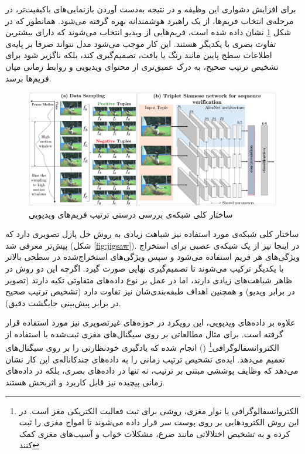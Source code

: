 برای افزایش دشواری این وظیفه و در نتیجه به‌دست آوردن بازنمایی‌های باکیفیت‌تر، در مرحله‌ی انتخاب فریم‌ها، از یک راهبرد هوشمندانه بهره گرفته می‌شود. همانطور که در شکل \ref{fig:video-permutation} نشان داده شده است، فریم‌هایی از ویدیو انتخاب می‌شوند که دارای بیشترین تفاوت‌ بصری با یکدیگر هستند. این کار موجب می‌شود مدل نتواند صرفا بر پایه‌ی اطلاعات سطح پایین مانند رنگ یا بافت، تصمیم‌گیری کند، بلکه ناگزیر شود برای تشخیص ترتیب صحیح، به درک عمیق‌تری از محتوای ویدیویی و روابط زمانی میان فریم‌ها برسد.

\begin{figure}[htbp]
\centering
\includegraphics[width=1\textwidth]{Images/Chapter2/video-permutation.png}
\caption{ساختار کلی شبکه‌ی بررسی درستی ترتیب فریم‌های ویدیویی}
\label{fig:video-permutation}
\end{figure}

ساختار کلی شبکه‌ی مورد استفاده نیز شباهت زیادی به روش حل پازل تصویری دارد که پیش‌تر معرفی شد (شکل \ref{fig:jigsaw}). در اینجا نیز از یک شبکه‌ی عصبی برای استخراج ویژگی‌های هر فریم استفاده می‌شود و سپس ویژگی‌های استخراج‌شده در سطحی بالاتر با یکدیگر ترکیب می‌شوند تا تصمیم‌گیری نهایی صورت گیرد. اگرچه این دو روش در ظاهر شباهت‌های زیادی دارند، اما در عمل بر نوع داده‌های متفاوتی تکیه دارند (تصویر در برابر ویدیو) و همچنین اهداف طبقه‌بندی‌شان نیز تفاوت دارد (تشخیص ترتیب صحیح در برابر پیش‌بینی جایگشت دقیق).

علاوه بر داده‌های ویدیویی، این رویکرد در حوزه‌های غیرتصویری نیز مورد استفاده قرار گرفته است. برای مثال مطالعاتی بر روی سیگنال‌های مغزی ثبت‌شده با استفاده از الکتروانسفالوگرافی\footnote{الکتروانسفالوگرافی یا نوار مغزی، روشی برای ثبت فعالیت الکتریکی مغز است. در این روش الکترودهایی بر روی پوست سر قرار داده می‌شوند تا امواج مغزی را ثبت کرده و به تشخیص اختلالاتی مانند صرع، مشکلات خواب و آسیب‌های مغزی کمک کنند} () انجام شده که یادگیری خودنظارتی را بر روی سیگنال‌های  تعمیم می‌دهد\cite{weng2025self}.
ایده‌ی تشخیص ترتیب زمانی را به داده‌های چندکاناله‌ی  این کار نشان می‌دهد که وظایف پوششی مبتنی بر ترتیب، نه تنها در داده‌های بصری، بلکه در داده‌های زمانی پیچیده نیز قابل کاربرد و اثربخش هستند.

